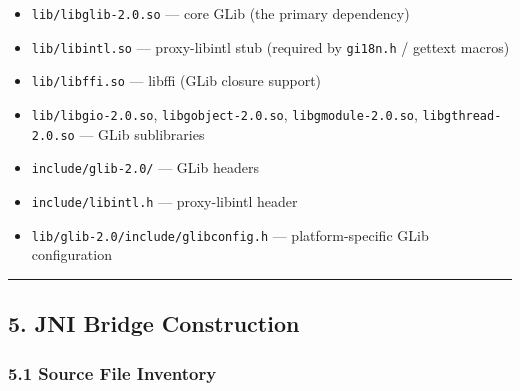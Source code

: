 \documentclass[11pt,a4paper]{article}
\providecommand{\tightlist}{\setlength{\itemsep}{2pt}\setlength{\parskip}{0pt}}
\begin{document}
\begin{itemize}
\tightlist
\item
  \texttt{lib/libglib-2.0.so} --- core GLib (the primary dependency)
\item
  \texttt{lib/libintl.so} --- proxy-libintl stub (required by
  \texttt{gi18n.h} / gettext macros)
\item
  \texttt{lib/libffi.so} --- libffi (GLib closure support)
\item
  \texttt{lib/libgio-2.0.so}, \texttt{libgobject-2.0.so},
  \texttt{libgmodule-2.0.so}, \texttt{libgthread-2.0.so} --- GLib
  sublibraries
\item
  \texttt{include/glib-2.0/} --- GLib headers
\item
  \texttt{include/libintl.h} --- proxy-libintl header
\item
  \texttt{lib/glib-2.0/include/glibconfig.h} --- platform-specific GLib
  configuration
\end{itemize}

\begin{center}\rule{0.5\linewidth}{0.5pt}\end{center}

\subsection{5. JNI Bridge Construction}\label{jni-bridge-construction}

\subsubsection{5.1 Source File Inventory}\label{source-file-inventory}
\end{document}
